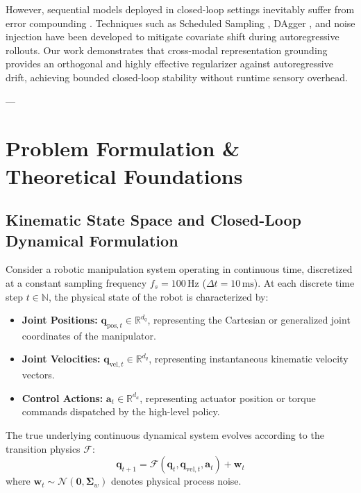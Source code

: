 \documentclass[11pt,a4paper]{article}
\begin{document}
However, sequential models deployed in closed-loop settings inevitably suffer from error compounding \cite{ross2011reduction, venkatraman2015improving}. Techniques such as Scheduled Sampling \cite{bengio2015scheduled}, DAgger \cite{ross2011reduction}, and noise injection have been developed to mitigate covariate shift during autoregressive rollouts. Our work demonstrates that cross-modal representation grounding provides an orthogonal and highly effective regularizer against autoregressive drift, achieving bounded closed-loop stability without runtime sensory overhead.

---

\section{Problem Formulation \& Theoretical Foundations}
\label{sec:problem_formulation}

\subsection{Kinematic State Space and Closed-Loop Dynamical Formulation}
Consider a robotic manipulation system operating in continuous time, discretized at a constant sampling frequency $f_s = 100\,\text{Hz}$ ($\Delta t = 10\,\text{ms}$). At each discrete time step $t \in \mathbb{N}$, the physical state of the robot is characterized by:
\begin{itemize}
    \item \textbf{Joint Positions:} $\mathbf{q}_{\text{pos}, t} \in \mathbb{R}^{d_q}$, representing the Cartesian or generalized joint coordinates of the manipulator.
    \item \textbf{Joint Velocities:} $\mathbf{q}_{\text{vel}, t} \in \mathbb{R}^{d_q}$, representing instantaneous kinematic velocity vectors.
    \item \textbf{Control Actions:} $\mathbf{a}_t \in \mathbb{R}^{d_a}$, representing actuator position or torque commands dispatched by the high-level policy.
\end{itemize}
The true underlying continuous dynamical system evolves according to the transition physics $\mathcal{F}$:
\begin{equation}
    \mathbf{q}_{t+1} = \mathcal{F}(\mathbf{q}_t, \mathbf{q}_{\text{vel}, t}, \mathbf{a}_t) + \mathbf{w}_t
\end{equation}
where $\mathbf{w}_t \sim \mathcal{N}(\mathbf{0}, \boldsymbol{\Sigma}_w)$ denotes physical process noise.
\end{document}

